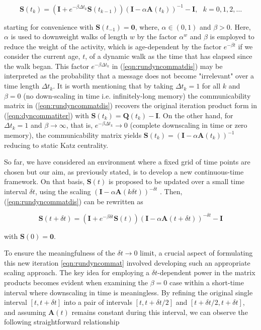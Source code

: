 \begin{equation}
\label{eqn:rundyncommatdis}
    \mathbf{S}(t_{k}) = \left(\mathbf{I} + e^{-\beta\Delta t_k} \mathbf{S}(t_{k-1})\right)\left(\mathbf{I} -  \alpha \mathbf{A}(t_{k})\right)^{-1} - \mathbf{I}, ~~~k=0,1,2,\dots
\end{equation}

 starting for convenience with $\mathbf{S}(t_{-1}) = \mathbf{0}$, where, $\alpha \in (0,1)$ and $\beta > 0$. Here, $\alpha$ is used to downweight walks of length $w$ by the factor $\alpha^w$ and $\beta$ is employed to reduce the weight of the activity, which is age-dependent by the factor $e^{-\beta t}$ if we consider the current age, $t$, of a dynamic walk as the time that has elapsed since the walk began. This factor $e^{-\beta\Delta t_k}$ in (\ref{eqn:rundyncommatdis}) may be interpreted as the probability that a message does not become "irrelevant" over a time length $\Delta t_k$. It is worth mentioning that by taking $\Delta t_k = 1$ for all $k$ and $\beta = 0$ (no down-scaling in time i.e. infinitely-long memory) the communicability matrix in (\ref{eqn:rundyncommatdis}) recovers the original iteration product form in (\ref{eqn:dyncommatiter}) with $\mathbf{S}(t_k) = \mathbf{Q}(t_k) - \mathbf{I}$. On the other hand, for $\Delta t_k = 1$ and $\beta \to \infty$, that is, $e^{-\beta\Delta t_k}\to 0$ (complete downscaling in time or zero memory), the communicability matrix yields $\mathbf{S}(t_k)=(\mathbf{I} - \alpha \mathbf{A}(t_k))^{-1}$ reducing to static Katz centrality.

 So far, we have considered an environment where a fixed grid of time points are chosen but our aim, as previously stated, is to develop a new continuous-time framework. On that basis, $\mathbf{S}(t)$ is proposed to be updated over a small time interval $\delta t$, using the scaling $(\mathbf{I}-\alpha\mathbf{A}(k\delta t))^{-\delta t}$ \cite{grindrod2014dynamical}. Then, (\ref{eqn:rundyncommatdis}) can be rewritten as
 
 \begin{equation}
\label{eqn:rundyncommat}
    \mathbf{S}(t + \delta t) = \left(\mathbf{I} + e^{-\beta\delta t}\mathbf{S}(t)\right) (\mathbf{I} - \alpha\mathbf{A}(t+\delta t))^{-\delta t} - \mathbf{I}
\end{equation} 

with $\mathbf{S}(0)=\mathbf{0}$.
 
To ensure the meaningfulness of the $\delta t\to 0$ limit, a crucial aspect of formulating this new iteration \eqref{eqn:rundyncommat} involved developing such an appropriate scaling approach. The key idea for employing a $\delta t$-dependent power in the matrix products becomes evident when examining the $\beta=0$ case within a short-time interval where downscaling in
time is meaningless. By refining the original single interval $[t,t+\delta t]$ into a pair of intervals $[t, t + \delta t/2]$ and $[t + \delta t/2, t + \delta t]$, and assuming $\mathbf{A}(t)$ remains constant during this interval, we can observe the following straightforward relationship 
 
